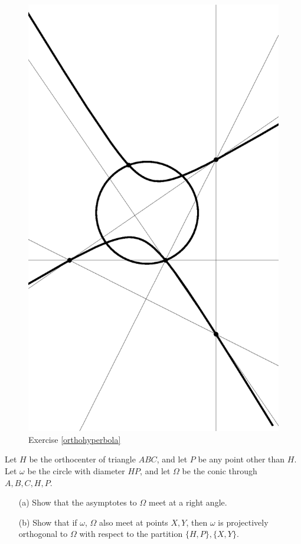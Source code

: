 \begin{figure}[!htb]
\centering
\includegraphics[scale=0.5,angle=270]{righthyperbola.eps}
\caption{Exercise \ref{orthohyperbola}}\label{righthyperbola}
\end{figure}

\begin{exer}\label{orthohyperbola} Let $H$ be the orthocenter of triangle $ABC$, and let $P$ be any point other than $H$. Let $\omega$ be the circle with diameter $HP$, and let $\Omega$ be the conic through $A,B,C,H,P$.
\begin{itemize}
\item[(a)] Show that the asymptotes to $\Omega$ meet at a right angle.

\item[(b)] Show that if $\omega$, $\Omega$ also meet at points $X,Y$, then $\omega$ is projectively orthogonal to $\Omega$ with respect to the partition $\{H,P\},\{X,Y\}$.
\end{itemize}
\end{exer}

